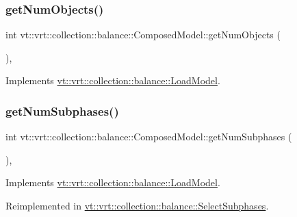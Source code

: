 \subsubsection{\texorpdfstring{get\+Num\+Objects()}{getNumObjects()}}
{\footnotesize\ttfamily int vt\+::vrt\+::collection\+::balance\+::\+Composed\+Model\+::get\+Num\+Objects (\begin{DoxyParamCaption}{ }\end{DoxyParamCaption})\hspace{0.3cm}{\ttfamily [override]}, {\ttfamily [virtual]}}



Implements \hyperlink{classvt_1_1vrt_1_1collection_1_1balance_1_1_load_model_a87b90c2daf3a34243a7a2af266aa0b29}{vt\+::vrt\+::collection\+::balance\+::\+Load\+Model}.

\mbox{\label{classvt_1_1vrt_1_1collection_1_1balance_1_1_composed_model_af3ea09828c281d9c278198a19fe4e533}} 
\subsubsection{\texorpdfstring{get\+Num\+Subphases()}{getNumSubphases()}}
{\footnotesize\ttfamily int vt\+::vrt\+::collection\+::balance\+::\+Composed\+Model\+::get\+Num\+Subphases (\begin{DoxyParamCaption}{ }\end{DoxyParamCaption})\hspace{0.3cm}{\ttfamily [override]}, {\ttfamily [virtual]}}



Implements \hyperlink{classvt_1_1vrt_1_1collection_1_1balance_1_1_load_model_ab46ea62e4228d4a64de9dd0adfe81af2}{vt\+::vrt\+::collection\+::balance\+::\+Load\+Model}.



Reimplemented in \hyperlink{classvt_1_1vrt_1_1collection_1_1balance_1_1_select_subphases_a347673e0bbc4ded04f32d97fea8f5b68}{vt\+::vrt\+::collection\+::balance\+::\+Select\+Subphases}.

\mbox{\label{classvt_1_1vrt_1_1collection_1_1balance_1_1_composed_model_a5de9a43648cfd18ca00f1f0a6c61be4d}} 
